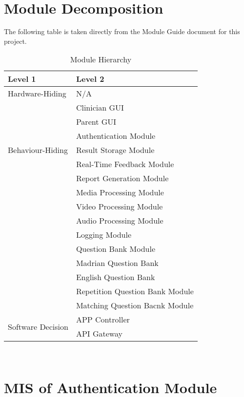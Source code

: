 \documentclass[12pt, titlepage]{article}
\begin{document}
\section{Module Decomposition}

The following table is taken directly from the Module Guide document for this project.

\begin{table}[h!]
\centering
\begin{tabular}{p{} p{}}
\toprule
\textbf{Level 1} & \textbf{Level 2}\\
\midrule

{Hardware-Hiding} & N/A \\
\midrule

\multirow{7}{0.3\textwidth}{Behaviour-Hiding} & Clinician GUI\\
& Parent GUI\\
& Authentication Module\\
& Result Storage Module\\
& Real-Time Feedback Module\\ 
& Report Generation Module\\
& Media Processing Module\\
& Video Processing Module\\
& Audio Processing Module\\
& Logging Module\\
& Question Bank Module\\
& Madrian Question Bank\\
& English Question Bank\\
& Repetition Question Bank Module\\
& Matching Question Bacnk Module\\
\midrule

\multirow{3}{0.3\textwidth}{Software Decision} & {APP Controller}\\
& API Gateway\\
\bottomrule

\end{tabular}
\caption{Module Hierarchy}
\label{TblMH}
\end{table}

\newpage
~\newpage

\section{MIS of Authentication Module} \label{AuthenticationModule}
\end{document}
